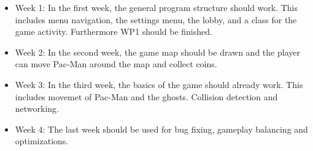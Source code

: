 \documentclass{report}
\begin{document}
\begin{itemize}
	\item Week 1: In the first week, the general program structure should work. This includes menu navigation, the settings menu, the lobby, and a class for the game activity. Furthermore WP1 should be finished. 
	\item Week 2: In the second week, the game map should be drawn and the player can move Pac-Man around the map and collect coins.
	\item Week 3: In the third week, the basics of the game should already work. This includes movemet of Pac-Man and the ghosts. Collision detection and networking.
	\item Week 4: The last week should be used for bug fixing, gameplay balancing and optimizations.
\end{itemize}




\end{document}
